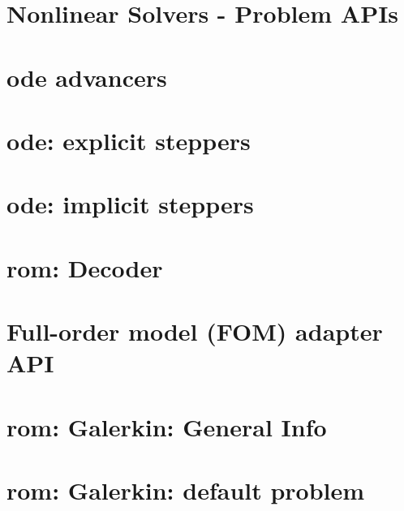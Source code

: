 \let\mypdfximage\pdfximage\def\pdfximage{\immediate\mypdfximage}\documentclass[twoside]{book}
\newcommand{\+}{\discretionary{\mbox{\scriptsize$\hookleftarrow$}}{}{}}
\begin{document}
\chapter{Nonlinear Solvers -\/ Problem APIs}
\label{md_pages_components_nonlinsolvers_system_api}

\chapter{ode advancers}
\label{md_pages_components_ode_advance}

\chapter{ode\+: explicit steppers}
\label{md_pages_components_ode_steppers_explicit}

\chapter{ode\+: implicit steppers}
\label{md_pages_components_ode_steppers_implicit}

\chapter{rom\+: Decoder}
\label{md_pages_components_rom_decoder}

\chapter{Full-\/order model (FOM) adapter API}
\label{md_pages_components_rom_fom_apis}

\chapter{rom\+: Galerkin\+: General Info}
\label{md_pages_components_rom_galerkin}

\chapter{rom\+: Galerkin\+: default problem}
\label{md_pages_components_rom_galerkin_default}

\end{document}
